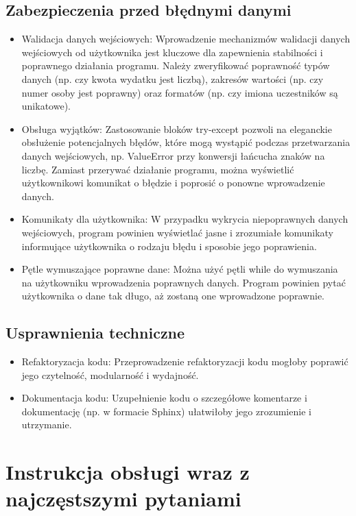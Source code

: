 \documentclass{article}
\begin{document}
\subsection{Zabezpieczenia przed błędnymi danymi}
\begin{itemize}
\item Walidacja danych wejściowych: Wprowadzenie mechanizmów walidacji danych wejściowych od użytkownika jest kluczowe dla zapewnienia stabilności i poprawnego działania programu. Należy zweryfikować poprawność typów danych (np. czy kwota wydatku jest liczbą), zakresów wartości (np. czy numer osoby jest poprawny) oraz formatów (np. czy imiona uczestników są unikatowe).
\item Obsługa wyjątków: Zastosowanie bloków try-except pozwoli na eleganckie obsłużenie potencjalnych błędów, które mogą wystąpić podczas przetwarzania danych wejściowych, np. ValueError przy konwersji łańcucha znaków na liczbę. Zamiast przerywać działanie programu, można wyświetlić użytkownikowi komunikat o błędzie i poprosić o ponowne wprowadzenie danych.
\item Komunikaty dla użytkownika: W przypadku wykrycia niepoprawnych danych wejściowych, program powinien wyświetlać jasne i zrozumiałe komunikaty informujące użytkownika o rodzaju błędu i sposobie jego poprawienia.
\item Pętle wymuszające poprawne dane: Można użyć pętli while do wymuszania na użytkowniku wprowadzenia poprawnych danych. Program powinien pytać użytkownika o dane tak długo, aż zostaną one wprowadzone poprawnie.
\end{itemize}
\subsection{Usprawnienia techniczne}
\begin{itemize}
\item Refaktoryzacja kodu: Przeprowadzenie refaktoryzacji kodu mogłoby poprawić jego czytelność, modularność i wydajność.
\item Dokumentacja kodu: Uzupełnienie kodu o szczegółowe komentarze i dokumentację (np. w formacie Sphinx) ułatwiłoby jego zrozumienie i utrzymanie.
\end{itemize}
\section{Instrukcja obsługi wraz z najczęstszymi pytaniami}
\end{document}
